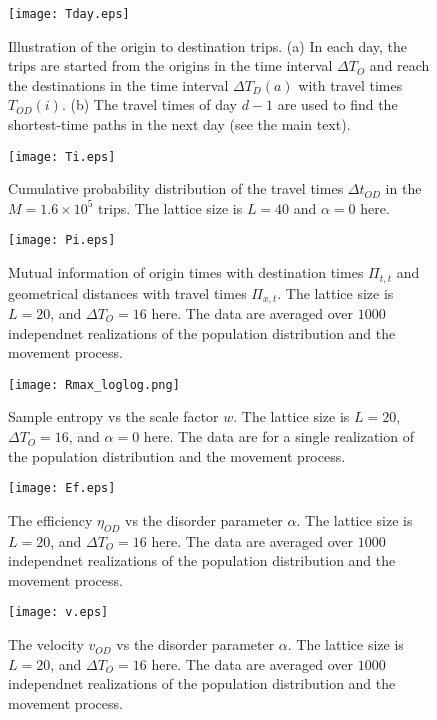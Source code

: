\documentclass[aps,preprint]{revtex4-1}
\begin{document}
\begin{figure}
\texttt{[image: Tday.eps]} 
\caption{Illustration of the origin to destination trips. (a) In each day, the trips are started from the origins in the time interval $\Delta T_O$ and reach the destinations in the time interval $\Delta T_D(a)$ with travel times $T_{OD}(i)$. (b) The travel times of day $d-1$ are used to find the shortest-time paths in the next day (see the main text).}\label{Tday}
\end{figure}


\begin{figure}
\texttt{[image: Ti.eps]} 
\caption{Cumulative probability distribution of the travel times $\Delta t_{OD}$ in the $M=1.6\times 10^5$ trips. The lattice size is $L=40$ and $\alpha=0$ here.}\label{Ti}
\end{figure}


\begin{figure}
\texttt{[image: Pi.eps]} 
\caption{Mutual information of origin times with destination times $\Pi_{t,t}$ and geometrical distances with travel times $\Pi_{x,t}$. The lattice size is $L=20$, and $\Delta T_O=16$ here. The data are averaged over $1000$ independnet realizations of the population distribution and the movement process.}\label{Pi}
\end{figure}


\begin{figure}
\texttt{[image: Rmax\_loglog.png]} 
\caption{Sample entropy vs the scale factor $w$. The lattice size is $L=20$, $\Delta T_O=16$, and $\alpha=0$ here. The data are for a single realization of the population distribution and the movement process.}\label{Sw}
\end{figure}


\begin{figure}
\texttt{[image: Ef.eps]} 
\caption{The efficiency $\eta_{OD}$ vs the disorder parameter $\alpha$. The lattice size is $L=20$, and $\Delta T_O=16$ here. The data are averaged over $1000$ independnet realizations of the population distribution and the movement process. }\label{Ef}
\end{figure}


\begin{figure}
\texttt{[image: v.eps]} 
\caption{The velocity $v_{OD}$ vs the disorder parameter $\alpha$. The lattice size is $L=20$, and $\Delta T_O=16$ here. The data are averaged over $1000$ independnet realizations of the population distribution and the movement process.}\label{v}
\end{figure}
\end{document}
